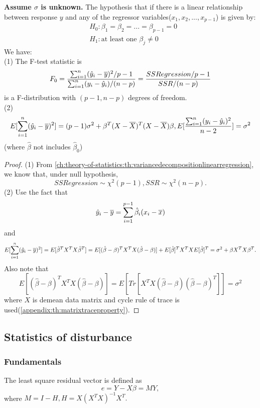 \begin{refsection}
\begin{lemma}\cite[80]{montgomery2012introduction}\label{ch:statistical-models:th:LackOfFitFtestMultipleRegression}
	\textbf{Assume $\sigma$ is unknown.}
	The hypothesis that if there is a linear relationship between response $y$ and any of the regressor variables($x_1,x_2,...,x_{p-1}$) is given by:
	\begin{align*}
	&H_0: \beta_1 = \beta_2 = ... = \beta_{p-1} = 0\\
	&H_1: \text{at least one }\beta_j \neq 0
	\end{align*}
	We have:\\
	(1)
	The F-test statistic is
	$$F_0 = \frac{\sum_{i=1}^n (\hat{y}_i - \overline{y})^2/p-1}{\sum_{i=1}^n (y_i-\hat{y}_i)/(n-p)} = \frac{SSRegression/p-1}{SSR/(n-p)}$$
	is a F-distribution with $(p-1,n-p)$ degrees of freedom.\\
	(2)  $$E[\sum_{i=1}^n (\hat{y}_i - \overline{y})^2] = (p-1)\sigma^2 + \beta^T(X-\overline{X})^T(X-\overline{X})\beta, E[\frac{\sum_{i=1}^n (y_i - \hat{y}_i)^2}{n-2}]=\sigma^2$$ 
	(where $\hat{\beta}$ not includes $\hat{\beta}_0$)
\end{lemma}
\begin{proof}
(1)  From \autoref{ch:theory-of-statistics:th:variancedecompositionlinearregression}, we know that, under null hypothesis,  $$SSRegression \sim \chi^2(p-1), SSR\sim \chi^2(n-p).$$ 
(2)	Use the fact that
	$$\hat{y}_i - \overline{y} =\sum_{i=1}^{p-1} \hat{\beta}_i (x_i-\overline{x}) $$
	and 
	$$E[\sum_{i=1}^n (\hat{y}_i - \overline{y})^2]=E[\hat{\beta}^TX^TX\hat{\beta}^T] = E[(\hat{\beta}-\beta)^TX^TX(\hat{\beta}-\beta)] + E[\hat{\beta}]^TX^TXE[\hat{\beta}]^T = \sigma^2 + \beta X^TX \beta^T.$$
	Also note that
	$$E[(\hat{\beta}-\beta)^TX^TX(\hat{\beta}-\beta)] = E[Tr[X^TX(\hat{\beta}-\beta)(\hat{\beta}-\beta)^T]] = \sigma^2$$
	where $X$ is demean data matrix and cycle rule of trace is used(\autoref{appendix:th:matrixtraceproperty}).
\end{proof}

\subsection{Statistics of disturbance}
\subsubsection{Fundamentals}
\begin{definition}\cite[194]{theil1971principles}
The least square residual vector is defined as
$$e = Y - X\beta = MY,$$
where $M = I-H, H = X(X^TX)^{-1}X^T.$	
\end{definition}


\end{refsection}
